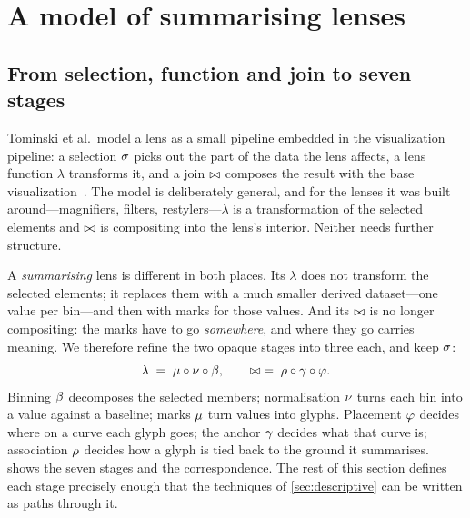 \section{A model of summarising lenses}
\label{sec:model}

\subsection{From selection, function and join to seven stages}

Tominski et al.\ model a lens as a small pipeline embedded in the
visualization pipeline: a selection $\sigma$ picks out the part of the data the
lens affects, a lens function $\lambda$ transforms it, and a join $\bowtie$
composes the result with the base visualization~\cite{tominski2014star,
tominski2017survey}. The model is deliberately general, and for the lenses it
was built around---magnifiers, filters, restylers---$\lambda$ is a
transformation of the selected elements and $\bowtie$ is compositing into the
lens's interior. Neither needs further structure.

A \emph{summarising} lens is different in both places. Its $\lambda$ does not
transform the selected elements; it replaces them with a much smaller derived
dataset---one value per bin---and then with marks for those values. And its
$\bowtie$ is no longer compositing: the marks have to go \emph{somewhere}, and
where they go carries meaning. We therefore refine the two opaque stages into
three each, and keep $\sigma$:
\begin{equation}
  \lambda \;=\; \mu \circ \nu \circ \beta,
  \qquad
  \bowtie \;=\; \rho \circ \gamma \circ \varphi .
  \label{eq:refine}
\end{equation}
Binning $\beta$ decomposes the selected members; normalisation $\nu$ turns each
bin into a value against a baseline; marks $\mu$ turn values into glyphs.
Placement $\varphi$ decides where on a curve each glyph goes; the anchor $\gamma$
decides what that curve is; association $\rho$ decides how a glyph is tied back
to the ground it summarises.  shows the seven stages and the
correspondence. The rest of this section defines each stage precisely enough
that the techniques of \cref{sec:descriptive} can be written as paths through
it.

